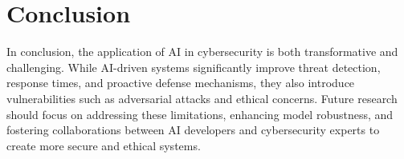 \documentclass[12pt,a4paper]{article}
\begin{document}
\section{Conclusion}
In conclusion, the application of AI in cybersecurity is both transformative and challenging. While AI-driven systems significantly improve threat detection, response times, and proactive defense mechanisms, they also introduce vulnerabilities such as adversarial attacks and ethical concerns. Future research should focus on addressing these limitations, enhancing model robustness, and fostering collaborations between AI developers and cybersecurity experts to create more secure and ethical systems.



\end{document}
